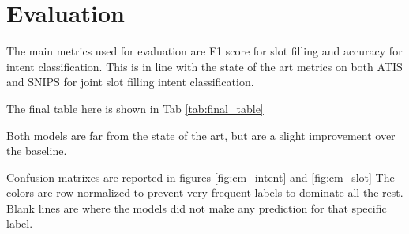 \documentclass[a4paper]{article}
\begin{document}
\section{Evaluation}

The main metrics used for evaluation are F1 score for slot filling and accuracy for intent classification. This is in line with the state of the art metrics on both ATIS and SNIPS for joint slot filling intent classification.

The final table here is shown in Tab \ref{tab:final_table}

Both models are far from the state of the art, but are a slight improvement over the baseline.

Confusion matrixes are reported in figures \ref{fig:cm_intent} and \ref{fig:cm_slot}
The colors are row normalized to prevent very frequent labels to dominate all the rest. 
Blank lines are where the models did not make any prediction for that specific label.
\end{document}
